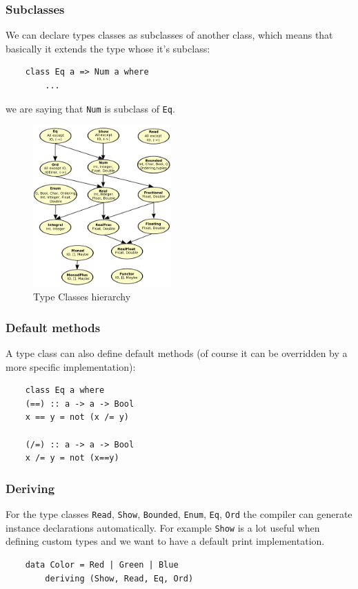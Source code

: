 \subsubsection{Subclasses}
We can declare types classes as subclasses of another class, which means that basically it extends the type whose it's subclass:
\begin{verbatim}
    class Eq a => Num a where
        ...
\end{verbatim}
we are saying that \verb|Num| is subclass of \verb|Eq|.
\begin{figure}[H]
    \centering
    \includegraphics[width=200px]{images/7_Functional_Programming/type_classes_hierarchy.png}
    \caption{Type Classes hierarchy}
\end{figure}

\subsubsection{Default methods}
A type class can also define default methods (of course it can be overridden by a more specific implementation):
\begin{verbatim}
    class Eq a where
    (==) :: a -> a -> Bool
    x == y = not (x /= y)

    (/=) :: a -> a -> Bool
    x /= y = not (x==y)
\end{verbatim}

\subsubsection{Deriving}
For the type classes \verb|Read|, \verb|Show|, \verb|Bounded|, \verb|Enum|, \verb|Eq|, \verb|Ord| the compiler can generate instance declarations automatically.
For example \verb|Show| is a lot useful when defining custom types and we want to have a default print implementation.
\begin{verbatim}
    data Color = Red | Green | Blue
        deriving (Show, Read, Eq, Ord)
\end{verbatim}

